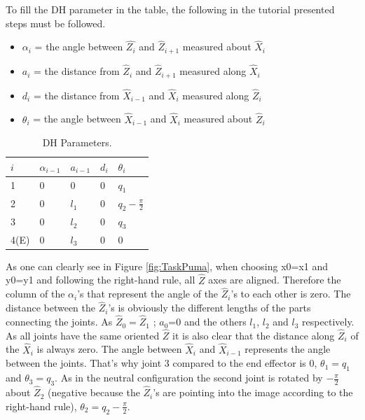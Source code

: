 To fill the DH parameter in the table, the following in the tutorial presented steps must be followed.

\begin{itemize}
    \item $\alpha_i$ = the angle between $\hat{Z_i}$ and $\hat{Z}_{i+1}$ measured about $\hat{X}_i$
    \item $a_i$ = the distance from $\hat{Z}_i$ and $\hat{Z}_{i+1}$ measured along $\hat{X}_i$
    \item $d_i$ = the distance from $\hat{X}_{i-1}$ and $\hat{X}_{i}$ measured along $\hat{Z}_i$
    \item $\theta_i$ = the angle between $\hat{X}_{i-1}$ and $\hat{X}_{i}$ measured about $\hat{Z}_i$
\end{itemize}

\begin{table}[h]
    \centering
    \begin{tabular}{ |p{1cm}|p{1cm}|p{1cm}|p{1cm}|p{1.5cm}|  } 
        \hline 
       $i$ & $\alpha_{i-1}$ & $a_{i-1}$ &$d_i$ & $\theta_i$\\
        \hline
        \hline
       1 &  0 & 0 & 0 & $q_1$\\
        \hline
         2 &  0 & $l_1$ & 0 & $q_2-\frac{\pi}{2}$\\
          \hline
         3 &  0 &$l_2$& 0 & $q_3$\\
         \hline
         4(E) &  0 & $l_3$ & 0 & 0\\
        \hline
    \end{tabular}
    \caption{DH Parameters.}
    \label{Table:DH}
\end{table}

As one can clearly see in Figure \ref{fig:TaskPuma}, when choosing x0=x1 and y0=y1 and following the right-hand rule, all $\hat{Z}$ axes are aligned. Therefore the column of the $\alpha_i$'s that represent the angle of the $\hat{Z}_i$'s to each other is zero. The distance between the $\hat{Z}_i$'s is obviously the different lengths of the parts connecting the joints. As $\hat{Z}_0 = \hat{Z}_1$ ; $a_0$=0 and the others $l_1$, $l_2$ and $l_3$ respectively. As all joints have the same oriented $\hat{Z}$ it is also clear that the distance along $\hat{Z}_i$ of the $\hat{X}_i$ is always zero. The angle between $\hat{X}_i$ and $\hat{X}_{i-1}$ represents the angle between the joints. That's why joint 3 compared to the end effector is 0,  $\theta_1=q_1$ and $\theta_3=q_3$. As in the neutral configuration the second joint is rotated by $-\frac{\pi}{2}$ about $\hat{Z}_2$ (negative because the $\hat{Z}_i$'s are pointing into the image according to the right-hand rule), $\theta_2=q_2-\frac{\pi}{2}$.




